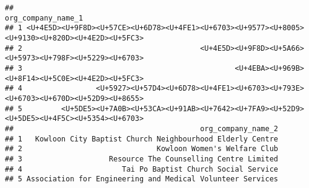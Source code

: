 \documentclass[]{article}
\begin{document}
\begin{verbatim}
##                                                                                 org_company_name_1
## 1 <U+4E5D><U+9F8D><U+57CE><U+6D78><U+4FE1><U+6703><U+9577><U+8005><U+9130><U+820D><U+4E2D><U+5FC3>
## 2                                         <U+4E5D><U+9F8D><U+5A66><U+5973><U+798F><U+5229><U+6703>
## 3                                                 <U+4EBA><U+969B><U+8F14><U+5C0E><U+4E2D><U+5FC3>
## 4                 <U+5927><U+57D4><U+6D78><U+4FE1><U+6703><U+793E><U+6703><U+670D><U+52D9><U+8655>
## 5         <U+5DE5><U+7A0B><U+53CA><U+91AB><U+7642><U+7FA9><U+52D9><U+5DE5><U+4F5C><U+5354><U+6703>
##                                           org_company_name_2
## 1   Kowloon City Baptist Church Neighbourhood Elderly Centre
## 2                               Kowloon Women's Welfare Club
## 3                    Resource The Counselling Centre Limited
## 4                       Tai Po Baptist Church Social Service
## 5 Association for Engineering and Medical Volunteer Services
\end{verbatim}
\end{document}
